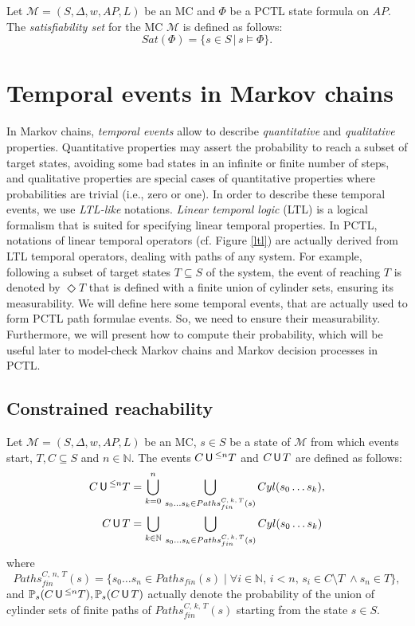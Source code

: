 \begin{definition}
  Let $\mathcal{M}=(S, \Delta, w, AP, L)$ be an MC and $\Phi$ be a PCTL state formula on $AP$. The \textit{satisfiability set} for the MC $\mathcal{M}$ is defined as follows:
  \[
    Sat(\Phi) = \{ s \in S \, | \, s \models \Phi \}.
  \]
\end{definition}

\section{Temporal events in Markov chains}\label{tempevent}
In Markov chains, \textit{temporal events} allow to describe \textit{quantitative} and \textit{qualitative} properties.
Quantitative properties may assert the probability to reach a subset of target states, avoiding some bad states in an infinite or finite number of steps, and
qualitative properties are special cases of quantitative properties where probabilities are trivial (i.e., zero or one).
In order to describe these temporal events, we use \textit{LTL-like} notations.
\textit{Linear temporal logic} (LTL) is a logical formalism
that is suited for specifying linear temporal properties.
In PCTL, notations of linear temporal operators (cf. Figure \ref{ltl}) are actually derived from LTL temporal operators, dealing with paths of any system.
For example, following a subset of target states $T \subseteq S$ of the system, the event of reaching $T$ is denoted by $\Diamond T$ that is defined with a finite union of cylinder sets, ensuring its measurability.
We will define here some temporal events, that are actually used to form PCTL path formulae events. So, we need to ensure their measurability.
Furthermore, we will present how to compute their probability, which will be useful later to model-check Markov chains and Markov decision processes in PCTL.
\subsection{Constrained reachability}
\begin{definition}
Let $\mathcal{M}= (S, \Delta, w, AP, L)$ be an MC, $s \in S$ be a state of $\mathcal{M}$ from which events start, $T, C \subseteq S$ and $n \in \mathbb{N}$.
The events $C \,\text{\sffamily U}\,^{\leq n} T$ and $C \,\text{\sffamily U}\, T$ are defined as follows:
\begin{align*}
  C \,\text{\sffamily U}\,^{\leq n} T &= \bigcup_{k=0}^n\,\bigcup_{s_0\dots s_k \in Paths_{fin}^{C,\, k,\, T}(s)} Cyl(s_0\dots s_k),\\
  C \,\text{\sffamily U}\, T &= \bigcup_{k\in \mathbb{N}}\,\bigcup_{s_0\dots s_k \in Paths_{fin}^{C,\, k,\, T}(s)} Cyl(s_0\dots s_k)
\end{align*}
where \[Paths_{fin}^{C,\, n,\, T}(s) = \{ s_0 \dots s_n \in Paths_{fin}(s) \; | \; \forall i \in \mathbb{N},\, i < n, \, s_i \in C \setminus T \; \wedge s_n \in T\},\]
and $\mathbb{P}_s(C \,\text{\sffamily U}\,^{\leq n} T), \mathbb{P}_s(C \,\text{\sffamily U}\, T)$ actually denote the probability of the union of cylinder sets of finite paths  of $Paths_{fin}^{C, \, k, \, T}(s)$ starting from the state $s \in S$.
\end{definition}

